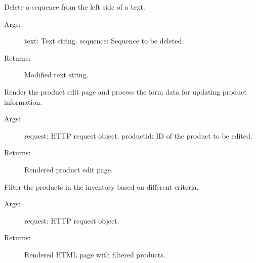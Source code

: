 \documentclass[letterpaper,10pt,english]{sphinxmanual}
\begin{document}
\begin{fulllineitems}
\label{\detokenize{modules/views:Inventory.views.DeleteLeftFromSequence}}
\sphinxAtStartPar
Delete a sequence from the left side of a text.
\begin{description}
\item[{Args:}] \leavevmode
\sphinxAtStartPar
text: Text string.
sequence: Sequence to be deleted.

\item[{Returns:}] \leavevmode
\sphinxAtStartPar
Modified text string.

\end{description}

\end{fulllineitems}


\begin{fulllineitems}
\label{\detokenize{modules/views:Inventory.views.EditProduct}}
\sphinxAtStartPar
Render the product edit page and process the form data for updating product information.
\begin{description}
\item[{Args:}] \leavevmode
\sphinxAtStartPar
request: HTTP request object.
productid: ID of the product to be edited.

\item[{Returns:}] \leavevmode
\sphinxAtStartPar
Rendered product edit page.

\end{description}

\end{fulllineitems}


\begin{fulllineitems}
\label{\detokenize{modules/views:Inventory.views.FilterInventory}}
\sphinxAtStartPar
Filter the products in the inventory based on different criteria.
\begin{description}
\item[{Args:}] \leavevmode
\sphinxAtStartPar
request: HTTP request object.

\item[{Returns:}] \leavevmode
\sphinxAtStartPar
Rendered HTML page with filtered products.

\end{description}

\end{fulllineitems}
\end{document}
